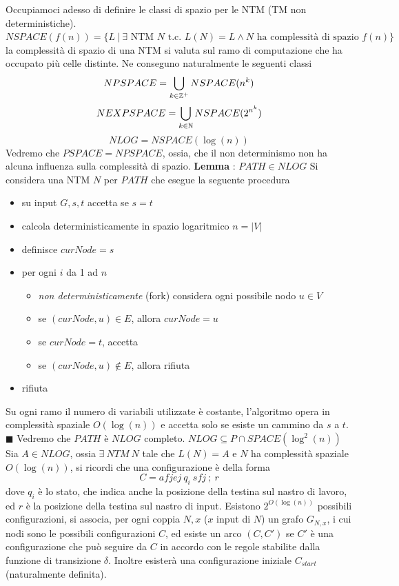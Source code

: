 \documentclass[10pt, letterpaper]{report}
\begin{document}
Occupiamoci adesso di definire le classi di spazio per le NTM (TM non deterministiche). \acc 
{} $NSPACE(f(n))=\{L \ | \ \exists \text{ NTM } N \text{ t.c. } L(N)=L \land N \text{ ha complessità di spazio } f(n)\}$\acc 
la complessità di spazio di una NTM si valuta sul ramo di computazione che ha occupato più celle distinte. Ne conseguno naturalmente le seguenti classi 
$$ NPSPACE=\bigcup_{k\in {\mathbb Z}^+}NSPACE(n^k)$$
$$ NEXPSPACE=\bigcup_{k\in {\mathbb N}}NSPACE(2^{n^k})$$
$$ NLOG=NSPACE(\log(n))$$
Vedremo che $PSPACE=NPSPACE$, ossia, che il non determinismo non ha alcuna influenza sulla complessità di spazio.\acc 
\textbf{Lemma} : $PATH\in NLOG$\acc 
\dimo{} Si considera una NTM $N$ per $PATH$ che esegue la seguente procedura\begin{itemize}
    \item su input $G,s,t$ accetta se $s=t$
    \item calcola deterministicamente in spazio logaritmico $n=|V|$
    \item definisce $curNode=s$
    \item per ogni $i$ da 1 ad $n$\begin{itemize}
        \item \textit{non deterministicamente} (fork) considera ogni possibile nodo $u\in V$
        \item se $(curNode,u)\in E$, allora $curNode=u$
        \item se $curNode=t$, accetta 
        \item se $(curNode,u)\notin E$, allora rifiuta
    \end{itemize}
    \item rifiuta 
 \end{itemize}
 Su ogni ramo il numero di variabili utilizzate è costante, l'algoritmo opera in complessità spaziale $O(\log(n))$ e accetta solo se esiste un cammino da $s$ a $t$.
\hfill$\blacksquare$\acc  
Vedremo che $PATH$ è $NLOG$ completo.\acc 
{} $NLOG\subseteq P\cap SPACE(\log^2(n))$\acc 
\dimo{} Sia $A\in NLOG$, ossia $\exists \  NTM \ N$ tale che $L(N)=A$ e $N$ ha complessità spaziale $O(\log(n))$, si ricordi che una configurazione è della forma 
$$ C=afjej\ q_i \ sfj \ ;\ r$$
dove $q_i$ è lo stato, che indica anche la posizione della testina sul nastro di lavoro, ed $r$ è la posizione della testina sul nastro di input. Esistono 
$2^{O(\log(n))}$ possibili configurazioni, si associa, per ogni coppia $N,x$ ($x$ input di $N$) un grafo $G_{N,x}$, i cui nodi sono le possibili configurazioni $C$, ed esiste un arco $(C,C')$ se $C'$ è una configurazione che può seguire da $C$ in accordo con le regole stabilite dalla funzione di transizione $\delta$. Inoltre esisterà una configurazione iniziale $C_{start}$ (naturalmente definita). 
\end{document}
